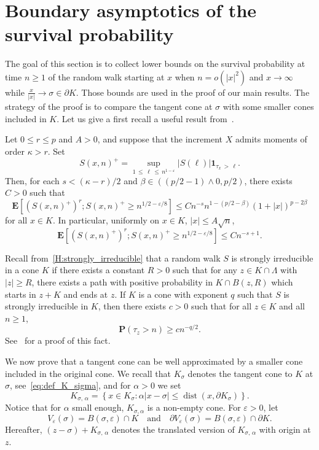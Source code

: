 \documentclass[AHL,Unicode,longabstracts,published]{cedram}
\DeclareMathOperator{\dist}{dist}
\newcommand{\pr}{\mathbf{P}}
\newcommand{\e}{\mathbf{E}}
\newcommand{\ind}{\mathbf{1}}
\renewcommand{\epsilon}{\varepsilon}
\renewcommand{\leq}{\leqslant}
\renewcommand{\geq}{\geqslant}
\begin{document}
\appendix
{}

\section{Boundary asymptotics of the survival probability}\label{sec:survival}

The goal of this section is to collect lower bounds on the survival probability at time $n\geq 1$ of the random walk starting at $x$ when $n=o(|x|^{2})$ and $x\rightarrow \infty$ while $\frac{x}{|x|}\rightarrow \sigma\in \partial K$. Those bounds are used in the proof of our main results. The strategy of the proof is to compare the tangent cone at $\sigma$ with some smaller cones included in $K$. Let us give a first recall a useful result from~\cite[Lemma~B.1]{RaTa-20}.


\begin{lemm}\label{Lemma_24_revisited}
Let $0\leq r\leq p$ and $A>0$, and suppose that the increment $X$ admits moments of order $\kappa>r$. Set
\[
S(x,n)^{+}=\sup_{1\,\leq\,\ell\,\leq\,n^{1-\epsilon}}
|S(\ell)| \ind_{\tau_{x}\,>\,\ell}.
\]
Then, for each $s<(\kappa-r)/2$ and $\beta\in ((p/2-1)\wedge 0,p/2)$, there exists $C>0$ such that
\[
\e\left[\left(S(x,n)^{+}\right)^{r};S(x,n)^{+}\geq n^{1/2-\epsilon/8}\right]\leq Cn^{-s}n^{1-(p/2-\beta)}(1+|x|)^{p-2\beta}
\]
for all $x\in K$. In particular, uniformly on $x\in K$, $|x|\leq A\sqrt{n}$,
\[
\e\left[\left(S(x,n)^{+}\right)^{r};S(x,n)^{+}\geq n^{1/2-\epsilon/8}\right]\leq Cn^{-s+1}.
\]
\end{lemm}

Recall from~\eqref{H:strongly_irreducible} that a random walk $S$ is strongly irreducible in a cone $K$ if there exists a constant $R>0$ such that for any $z\in K\cap \Lambda$ with $| z|\geq R$, there exists a path with positive probability in $K\cap B(z,R)$ which starts in $z+K$ and ends at $z$. If $K$ is a cone with exponent $q$ such that $S$ is strongly irreducible in $K$, then there exists $c>0$ such that for all $z\in{K}$ and all $n\geq 1$,
\begin{equation}\label{lowerBoundProbSurv}
\pr\left(\tau_{z}>n\right)\geq cn^{-q/2}.
\end{equation}
See~\cite[Lemma~4.5]{RaTa-20} for a proof of this fact.

We now prove that a tangent cone can be well approximated by a smaller cone included in the original cone. We recall that $K_{\sigma}$ denotes the tangent cone to $K$ at $\sigma$, see~\eqref{eq:def_K_sigma}, and for $\alpha>0$ we set
\[
K_{\sigma,\,\alpha}=\left\{ x\in K_{\sigma}: \alpha|x-\sigma|\leq \dist\left(x,\partial K_{\sigma}\right)\right\}.
\]
Notice that for $\alpha$ small enough, $K_{\sigma,\alpha}$ is a non-empty cone. For $\epsilon>0$, let
\[
V_{\epsilon}(\sigma)=B(\sigma,\epsilon)\cap K\quad \text{and}\quad \partial V_{\epsilon}(\sigma)=B(\sigma,\epsilon)\cap \partial K.
\]
Hereafter, $(z-\sigma)+K_{\sigma,\,\alpha}$ denotes the translated version of $K_{\sigma,\,\alpha}$ with origin at $z$.
\end{document}
